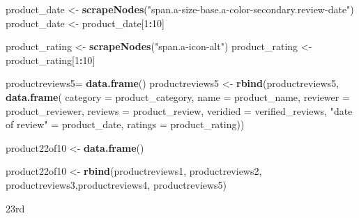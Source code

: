 \documentclass[
]{article}
\newenvironment{Shaded}{\begin{snugshade}}{\end{snugshade}}
\newcommand{\AttributeTok}[1]{\textcolor[rgb]{0.13,0.29,0.53}{#1}}
\newcommand{\DecValTok}[1]{\textcolor[rgb]{0.00,0.00,0.81}{#1}}
\newcommand{\FunctionTok}[1]{\textcolor[rgb]{0.13,0.29,0.53}{\textbf{#1}}}
\newcommand{\NormalTok}[1]{#1}
\newcommand{\OtherTok}[1]{\textcolor[rgb]{0.56,0.35,0.01}{#1}}
\newcommand{\SpecialCharTok}[1]{\textcolor[rgb]{0.81,0.36,0.00}{\textbf{#1}}}
\newcommand{\StringTok}[1]{\textcolor[rgb]{0.31,0.60,0.02}{#1}}
\begin{document}
\begin{Shaded}
\begin{Highlighting}[]
\NormalTok{  product\_date }\OtherTok{\textless{}{-}} \FunctionTok{scrapeNodes}\NormalTok{(}\StringTok{"span.a{-}size{-}base.a{-}color{-}secondary.review{-}date"}\NormalTok{)}
\NormalTok{  product\_date }\OtherTok{\textless{}{-}}\NormalTok{ product\_date[}\DecValTok{1}\SpecialCharTok{:}\DecValTok{10}\NormalTok{]}
  
\NormalTok{  product\_rating }\OtherTok{\textless{}{-}} \FunctionTok{scrapeNodes}\NormalTok{(}\StringTok{"span.a{-}icon{-}alt"}\NormalTok{)}
\NormalTok{  product\_rating }\OtherTok{\textless{}{-}}\NormalTok{ product\_rating[}\DecValTok{1}\SpecialCharTok{:}\DecValTok{10}\NormalTok{]}
  
\NormalTok{  productreviews5}\OtherTok{=} \FunctionTok{data.frame}\NormalTok{()}
\NormalTok{  productreviews5 }\OtherTok{\textless{}{-}} \FunctionTok{rbind}\NormalTok{(productreviews5, }\FunctionTok{data.frame}\NormalTok{(}
                      \AttributeTok{category =}\NormalTok{ product\_category,}
                      \AttributeTok{name =}\NormalTok{ product\_name,}
                      \AttributeTok{reviewer =}\NormalTok{ product\_reviewer,}
                      \AttributeTok{reviews =}\NormalTok{ product\_review,}
                      \AttributeTok{veridied =}\NormalTok{ verified\_reviews,}
                      \StringTok{"date of review"} \OtherTok{=}\NormalTok{ product\_date,}
                      \AttributeTok{ratings =}\NormalTok{ product\_rating))}
  
\NormalTok{  product22of10 }\OtherTok{\textless{}{-}} \FunctionTok{data.frame}\NormalTok{()}
  
\NormalTok{  product22of10 }\OtherTok{\textless{}{-}} \FunctionTok{rbind}\NormalTok{(productreviews1, productreviews2, productreviews3,productreviews4, productreviews5)}
\end{Highlighting}
\end{Shaded}

23rd
\end{document}
